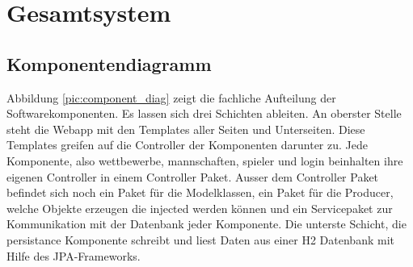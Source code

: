 \chapter{Gesamtsystem}

\section{Komponentendiagramm}
Abbildung \ref{pic:component_diag} zeigt die fachliche Aufteilung der Softwarekomponenten. Es lassen sich drei Schichten ableiten. An oberster Stelle steht die Webapp mit den Templates 
aller Seiten und Unterseiten. Diese Templates greifen auf die Controller der Komponenten darunter zu. Jede Komponente, also wettbewerbe, mannschaften, spieler und login beinhalten ihre 
eigenen Controller in einem Controller Paket. Ausser dem Controller Paket befindet sich noch ein Paket für die Modelklassen, ein Paket für die Producer, welche Objekte erzeugen die injected werden 
können und ein Servicepaket zur Kommunikation mit der Datenbank jeder Komponente. Die unterste Schicht, die persistance Komponente schreibt und liest Daten aus einer H2 Datenbank mit Hilfe 
des JPA-Frameworks. 





